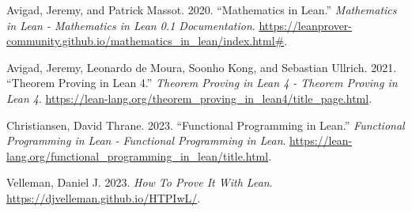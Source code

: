 \documentclass[
  letterpaper,
]{scrreprt}
\newlength{\cslhangindent}
\newlength{\cslentryspacingunit} %
\newenvironment{CSLReferences}[2] %
 {%
  \setlength{\parindent}{0pt}
  \ifodd #1
  \let\oldpar\par
  \def\par{\hangindent=\cslhangindent\oldpar}
  \fi
  \setlength{\parskip}{#2\cslentryspacingunit}
 }%
 {}
\theoremstyle{remark}
\begin{document}
\hypertarget{refs}{}
\begin{CSLReferences}{1}{0}
\leavevmode{}%
Avigad, Jeremy, and Patrick Massot. 2020. {``Mathematics in Lean.''}
\emph{Mathematics in Lean - Mathematics in Lean 0.1 Documentation}.
\url{https://leanprover-community.github.io/mathematics_in_lean/index.html\#}.

\leavevmode{}%
Avigad, Jeremy, Leonardo de Moura, Soonho Kong, and Sebastian Ullrich.
2021. {``Theorem Proving in Lean 4.''} \emph{Theorem Proving in Lean 4 -
Theorem Proving in Lean 4}.
\url{https://lean-lang.org/theorem_proving_in_lean4/title_page.html}.

\leavevmode{}%
Christiansen, David Thrane. 2023. {``Functional Programming in Lean.''}
\emph{Functional Programming in Lean - Functional Programming in Lean}.
\url{https://lean-lang.org/functional_programming_in_lean/title.html}.

\leavevmode{}%
Velleman, Daniel J. 2023. \emph{How To Prove It With Lean}.
\url{https://djvelleman.github.io/HTPIwL/}.

\end{CSLReferences}
\end{document}
